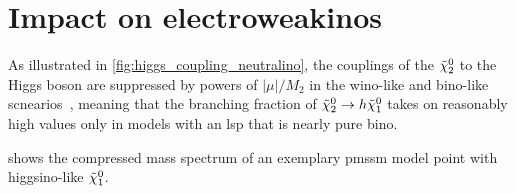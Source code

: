 \FloatBarrier


\section{Impact on electroweakinos}

As illustrated in \cref{fig:higgs_coupling_neutralino}, the couplings of the $\tilde{\chi}_2^0$ to the Higgs boson are suppressed by powers of $\vert\mu\vert/M_2$ in the wino-like and bino-like scnearios~\cite{Arbey:2012fa}, meaning that the branching fraction of $\tilde{\chi}_2^0 \rightarrow h \tilde{\chi}_1^0$ takes on reasonably high values only in models with an \gls{lsp} that is nearly pure bino.

 shows the compressed mass spectrum of an exemplary \gls{pmssm} model point with higgsino-like $\tilde{\chi}_1^0$.

